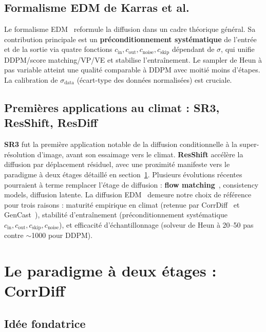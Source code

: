 \documentclass[14pt,a4paper,openany]{extreport}
\begin{document}
\subsection{Formalisme EDM de Karras et al.}
\label{ssec:soa-edm}

Le formalisme EDM~\cite{karras_edm_2022} reformule la diffusion dans un cadre théorique général. Sa contribution principale est un \textbf{préconditionnement systématique} de l'entrée et de la sortie via quatre fonctions $c_{\mathrm{in}}, c_{\mathrm{out}}, c_{\mathrm{noise}}, c_{\mathrm{skip}}$ dépendant de $\sigma$, qui unifie DDPM/score matching/VP/VE et stabilise l'entraînement. Le sampler de Heun à pas variable atteint une qualité comparable à DDPM avec moitié moins d'étapes. La calibration de $\sigma_{\mathrm{data}}$ (écart-type des données normalisées) est cruciale.

\subsection{Premières applications au climat : SR3, ResShift, ResDiff}
\label{ssec:soa-sr3-resdiff}

\textbf{SR3} fut la première application notable de la diffusion conditionnelle à la super-résolution d'image, avant son essaimage vers le climat. \textbf{ResShift} accélère la diffusion par déplacement résiduel, avec une proximité manifeste vers le paradigme à deux étages détaillé en section~\ref{sec:soa-corrdiff}. Plusieurs évolutions récentes pourraient à terme remplacer l'étage de diffusion : \textbf{flow matching}~\cite{lipman_flow_2023}, consistency models, diffusion latente. La diffusion EDM~\cite{karras_edm_2022} demeure notre choix de référence pour trois raisons : maturité empirique en climat (retenue par CorrDiff~\cite{mardani_corrdiff_2023} et GenCast~\cite{price_gencast_2024}), stabilité d'entraînement (préconditionnement systématique $c_{\mathrm{in}}, c_{\mathrm{out}}, c_{\mathrm{skip}}, c_{\mathrm{noise}}$), et efficacité d'échantillonnage (solveur de Heun à 20--50 pas contre $\sim$1000 pour DDPM).\label{ssec:soa-flow-matching}

\section{Le paradigme à deux étages : CorrDiff}
\label{sec:soa-corrdiff}

\subsection{Idée fondatrice}
\label{ssec:soa-corrdiff-idee}
\end{document}
